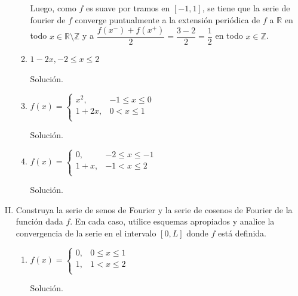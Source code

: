 \documentclass[fleqn]{article}
\newcommand{\real}{\mathbb{R}}
\newcommand{\ent}{\mathbb{Z}}
\begin{document}
\begin{enumerate}[I.]
\begin{enumerate}[(1)]
			Luego, como $f$ es suave por tramos en $ [-1,1] $, se tiene que la serie de fourier de $f$ converge puntualmente a la extensión periódica de $f$ a $ \real $ en todo $ x \in \real \setminus \ent $ y a $ \dfrac{f(x^-) + f(x^+)}{2} = \dfrac{3-2}{2} = \dfrac{1}{2} $ en todo $ x \in \ent $.

			\bfseries
			\item $ 1 - 2x, -2 \leq x \leq 2 $
			
			Solución.

			\normalfont



			\bfseries
			\item $ f(x) = \begin{cases}
				x^2, & -1 \leq x \leq 0 \\
				1 + 2x, & 0 < x \leq 1 \\
			\end{cases} $

			Solución.

			\normalfont



			\bfseries
			\item $ f(x) = \begin{cases}
				0, & -2 \leq x \leq -1 \\
				1 + x, & -1 < x \leq 2 \\
			\end{cases} $
			
			Solución.

			\normalfont



			\bfseries
		\end{enumerate}

		\item Construya la serie de senos de Fourier y la serie de cosenos de Fourier de la función dada $f$. En cada caso, utilice esquemas apropiados y analice la convergencia de la serie en el intervalo $ [0,L] $ donde $f$ está definida.
		
		\begin{enumerate}[(1)]
			\item $ f(x) = \begin{cases}
				0, & 0 \leq x \leq 1 \\
				1, & 1 < x \leq 2 \\
			\end{cases} $

			Solución.

			\normalfont




\end{enumerate}
\end{enumerate}
\end{document}
